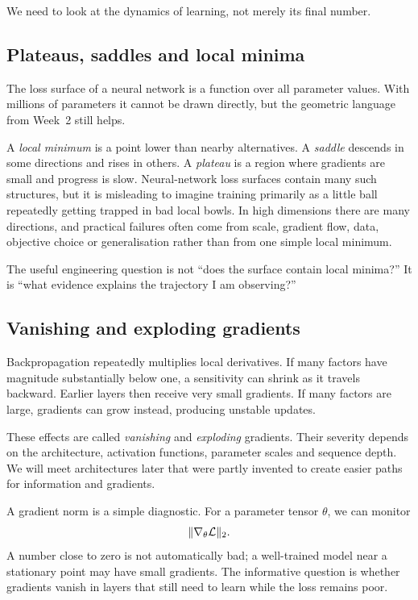 We need to look at the dynamics of learning, not merely its final number.

\subsection{Plateaus, saddles and local minima}

The loss surface of a neural network is a function over all parameter values. With millions of parameters it cannot be drawn directly, but the geometric language from Week~2 still helps.

A \emph{local minimum} is a point lower than nearby alternatives. A \emph{saddle} descends in some directions and rises in others. A \emph{plateau} is a region where gradients are small and progress is slow. Neural-network loss surfaces contain many such structures, but it is misleading to imagine training primarily as a little ball repeatedly getting trapped in bad local bowls. In high dimensions there are many directions, and practical failures often come from scale, gradient flow, data, objective choice or generalisation rather than from one simple local minimum.

The useful engineering question is not ``does the surface contain local minima?'' It is ``what evidence explains the trajectory I am observing?''

\subsection{Vanishing and exploding gradients}

Backpropagation repeatedly multiplies local derivatives. If many factors have magnitude substantially below one, a sensitivity can shrink as it travels backward. Earlier layers then receive very small gradients. If many factors are large, gradients can grow instead, producing unstable updates.

These effects are called \emph{vanishing} and \emph{exploding} gradients. Their severity depends on the architecture, activation functions, parameter scales and sequence depth. We will meet architectures later that were partly invented to create easier paths for information and gradients.

A gradient norm is a simple diagnostic. For a parameter tensor \(\theta\), we can monitor
\[
  \lVert \nabla_\theta \mathcal{L} \rVert_2.
\]
A number close to zero is not automatically bad; a well-trained model near a stationary point may have small gradients. The informative question is whether gradients vanish in layers that still need to learn while the loss remains poor.

